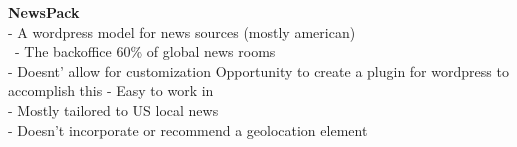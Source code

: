 \textbf{NewsPack}\\
-{\color{orange} A wordpress model for news sources (mostly american) \cite{Carvalho2020}}\\\
-{\color{orange} The backoffice 60\% of global news rooms \cite{Carvalho2020}}\\
-{\color{orange} Doesnt' allow for customization \cite{Carvalho2020}}{\color{purple} Opportunity to create a plugin for wordpress to accomplish this}
-{\color{orange} Easy to work in\cite{Carvalho2020}}\\
-{\color{orange} Mostly tailored to US local news \cite{Carvalho2020}}\\
-{\color{purple} Doesn't incorporate or recommend a geolocation element \cite{newspack}}\\

